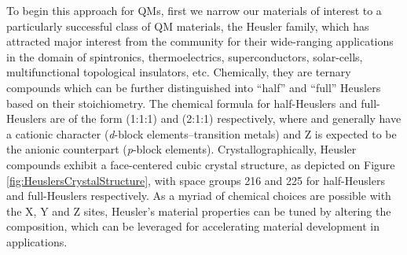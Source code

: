 \documentclass[article]{elsarticle}
\begin{document}

To begin this approach for QMs, first we narrow our materials of interest to a particularly successful class of QM materials, the Heusler family,\cite{galanakis2016theory,graf2010heusler,casper2012half,graf2011simple,poon2018recent,chibani2018first} which has attracted major interest from the community for their wide-ranging applications in the domain of spintronics,\cite{birsan2020zr,khandy2019full,casper2012half} thermoelectrics,\cite{zaferani2019strategies,poon2018recent,chibani2018first} superconductors,\cite{hu2021charge,xiao2018superconductivity,uzunok2020physical,kautzsch2019aupdtm} solar-cells,\cite{abdel2021high,murtaza2021lead,wang2020photoactive,leoncini2022correlating} multifunctional topological insulators,\cite{sattigeri2021dimensional,barman2018topological,zhang2020machine} etc. Chemically, they are ternary compounds which can be further distinguished into ``half'' and ``full'' Heuslers based on their stoichiometry. The chemical formula for half-Heuslers and full-Heuslers are of the form  (1:1:1) and  (2:1:1) respectively, where  and  generally have a cationic character (\textit{d}-block elements--transition metals) and Z is expected to be the anionic counterpart (\textit{p}-block elements). Crystallographically, Heusler compounds exhibit a face-centered cubic crystal structure, as depicted on Figure \ref{fig:HeuslersCrystalStructure}, with space groups \num{216} and \num{225} for half-Heuslers and full-Heuslers respectively. As a myriad of chemical choices are possible with the X, Y and Z sites, Heusler's material properties can be tuned by altering the composition, which can be leveraged for accelerating material development in applications.
\end{document}
